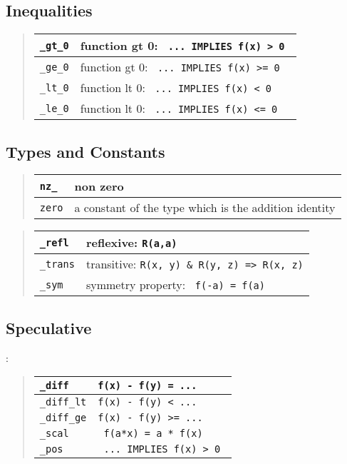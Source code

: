 \documentclass[12pt]{article}
\begin{document}
\subsection{Inequalities}
\begin{quote}
\begin{tabular}{|l|p{4.0in}|} \hline\hline
\verb|_gt_0| & function gt 0: \verb| ... IMPLIES f(x) > 0 | \\ \hline
\verb|_ge_0| & function gt 0: \verb| ... IMPLIES f(x) >= 0 | \\ \hline
\verb|_lt_0| & function lt 0: \verb| ... IMPLIES f(x) < 0 | \\ \hline
\verb|_le_0| & function lt 0: \verb| ... IMPLIES f(x) <= 0 | \\ \hline
\end{tabular}
\end{quote}

\subsection{Types and Constants}
\begin{quote}
\begin{tabular}{|l|p{4.0in}|} \hline\hline
\verb|nz_|   & non zero \\ \hline
\verb|zero|  & a constant of the type which is the addition identity \\ \hline
\end{tabular}
\end{quote}



\begin{quote}
\begin{tabular}{|l|p{4.0in}|} \hline\hline
\verb|_refl| & reflexive: \verb|R(a,a)| \\ \hline
\verb|_trans| & transitive: \verb|R(x, y) & R(y, z) => R(x, z)| \\ \hline
\verb|_sym|  & symmetry property: \verb| f(-a) = f(a)| \\ \hline
\end{tabular}
\end{quote}

\subsection{Speculative}:
\begin{quote}
\begin{tabular}{|l|p{4.0in}|} \hline\hline
\verb|_diff|  & \verb|f(x) - f(y) = ...| \\ \hline
\verb|_diff_lt|  & \verb|f(x) - f(y) < ...| \\ \hline
\verb|_diff_ge|  & \verb|f(x) - f(y) >= ...| \\ \hline
\verb|_scal |  & \verb| f(a*x) = a * f(x) | \\ \hline
\verb|_pos|  & \verb| ... IMPLIES f(x) > 0 | \\ \hline
\end{tabular}
\end{quote}
\end{document}
